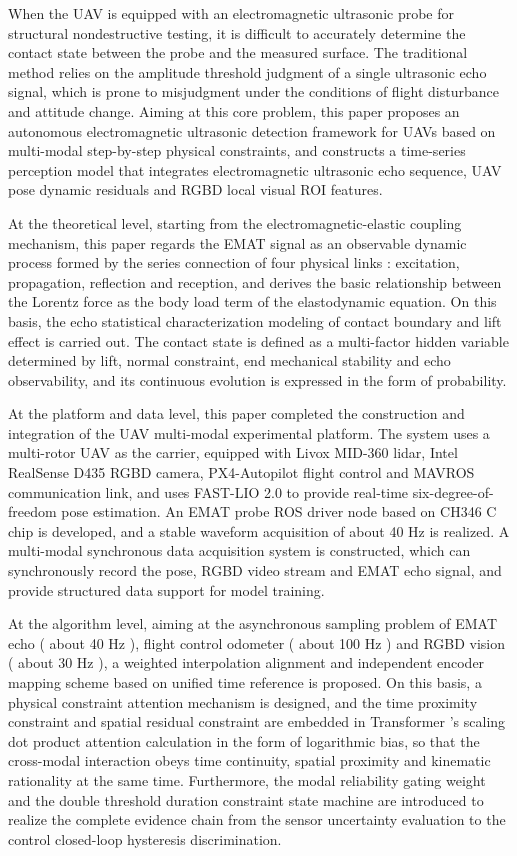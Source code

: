 \begin{englishabstract}
When the UAV is equipped with an electromagnetic ultrasonic probe for structural nondestructive testing, it is difficult to accurately determine the contact state between the probe and the measured surface. The traditional method relies on the amplitude threshold judgment of a single ultrasonic echo signal, which is prone to misjudgment under the conditions of flight disturbance and attitude change. Aiming at this core problem, this paper proposes an autonomous electromagnetic ultrasonic detection framework for UAVs based on multi-modal step-by-step physical constraints, and constructs a time-series perception model that integrates electromagnetic ultrasonic echo sequence, UAV pose dynamic residuals and RGBD local visual ROI features. 
 
At the theoretical level, starting from the electromagnetic-elastic coupling mechanism, this paper regards the EMAT signal as an observable dynamic process formed by the series connection of four physical links : excitation, propagation, reflection and reception, and derives the basic relationship between the Lorentz force as the body load term of the elastodynamic equation. On this basis, the echo statistical characterization modeling of contact boundary and lift effect is carried out. The contact state is defined as a multi-factor hidden variable determined by lift, normal constraint, end mechanical stability and echo observability, and its continuous evolution is expressed in the form of probability. 
 
At the platform and data level, this paper completed the construction and integration of the UAV multi-modal experimental platform. The system uses a multi-rotor UAV as the carrier, equipped with Livox MID-360 lidar, Intel RealSense D435 RGBD camera, PX4-Autopilot flight control and MAVROS communication link, and uses FAST-LIO 2.0 to provide real-time six-degree-of-freedom pose estimation. An EMAT probe ROS driver node based on CH346 C chip is developed, and a stable waveform acquisition of about 40 Hz is realized. A multi-modal synchronous data acquisition system is constructed, which can synchronously record the pose, RGBD video stream and EMAT echo signal, and provide structured data support for model training.

At the algorithm level, aiming at the asynchronous sampling problem of EMAT echo ( about 40 Hz ), flight control odometer ( about 100 Hz ) and RGBD vision ( about 30 Hz ), a weighted interpolation alignment and independent encoder mapping scheme based on unified time reference is proposed. On this basis, a physical constraint attention mechanism is designed, and the time proximity constraint and spatial residual constraint are embedded in Transformer 's scaling dot product attention calculation in the form of logarithmic bias, so that the cross-modal interaction obeys time continuity, spatial proximity and kinematic rationality at the same time. Furthermore, the modal reliability gating weight and the double threshold duration constraint state machine are introduced to realize the complete evidence chain from the sensor uncertainty evaluation to the control closed-loop hysteresis discrimination. 
 

\end{englishabstract}
